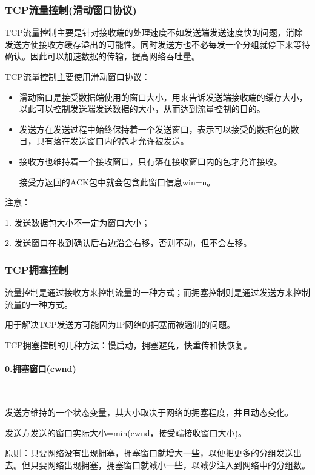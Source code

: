 \documentclass[UTF8]{article}%
\begin{document}
\subsubsection{TCP流量控制(滑动窗口协议)}

TCP流量控制主要是针对接收端的处理速度不如发送端发送速度快的问题，消除发送方使接收方缓存溢出的可能性。同时发送方也不必每发一个分组就停下来等待确认。因此可以加速数据的传输，提高网络吞吐量。

TCP流量控制主要使用滑动窗口协议：

\begin{itemize}
    \item 滑动窗口是接受数据端使用的窗口大小，用来告诉发送端接收端的缓存大小，以此可以控制发送端发送数据的大小，从而达到流量控制的目的。
    \item 发送方在发送过程中始终保持着一个发送窗口，表示可以接受的数据包的数目，只有落在发送窗口内的包才允许被发送。
    \item 接收方也维持着一个接收窗口，只有落在接收窗口内的包才允许接收。
    
    接受方返回的ACK包中就会包含此窗口信息win=n。

\end{itemize}

注意：

1. 发送数据包大小不一定为窗口大小；

2. 发送窗口在收到确认后右边沿会右移，否则不动，但不会左移。

\subsubsection{TCP拥塞控制}

流量控制是通过接收方来控制流量的一种方式；而拥塞控制则是通过发送方来控制流量的一种方式。

用于解决TCP发送方可能因为IP网络的拥塞而被遏制的问题。

TCP拥塞控制的几种方法：慢启动，拥塞避免，快重传和快恢复。

\paragraph{0.拥塞窗口(cwnd)}~{}

发送方维持的一个状态变量，其大小取决于网络的拥塞程度，并且动态变化。

发送方发送的窗口实际大小=min(cwnd，接受端接收窗口大小)。

原则：只要网络没有出现拥塞，拥塞窗口就增大一些，以便把更多的分组发送出去。但只要网络出现拥塞，拥塞窗口就减小一些，以减少注入到网络中的分组数。
\end{document}
